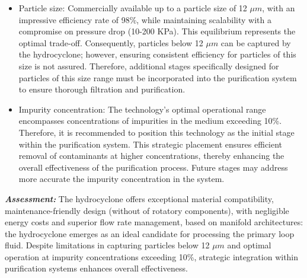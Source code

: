 \begin{tcolorbox}[colback=blue!5!white,enhanced,breakable,colframe=blue!75!black,title=Hydrocyclone]
 	\begin{itemize}
 		\item Particle size: Commercially available up to a particle size of 12 $\mu m$, with an impressive efficiency rate of 98\%, while maintaining scalability with a compromise on pressure drop (10-200 KPa). This equilibrium represents the optimal trade-off. Consequently, particles below 12 $\mu m$ can be captured by the hydrocyclone; however, ensuring consistent efficiency for particles of this size is not assured. Therefore, additional stages specifically designed for particles of this size range must be incorporated into the purification system to ensure thorough filtration and purification.
 		\item Impurity concentration: The technology's optimal operational range encompasses concentrations of impurities in the medium exceeding 10\%. Therefore, it is recommended to position this technology as the initial stage within the purification system. This strategic placement ensures efficient removal of contaminants at higher concentrations, thereby enhancing the overall effectiveness of the purification process. Future stages may address more accurate the impurity concentration in the system.
 	\end{itemize}
 	
 	\textbf{\textit{Assessment:}} The hydrocyclone offers exceptional material compatibility, maintenance-friendly design (without of rotatory components), with negligible energy costs and superior flow rate management, based on manifold architectures: the hydrocyclone emerges as an ideal candidate for processing the primary loop fluid. Despite limitations in capturing particles below 12 $\mu m$ and optimal operation at impurity concentrations exceeding 10\%, strategic integration within purification systems enhances overall effectiveness.
 	
 \end{tcolorbox}

